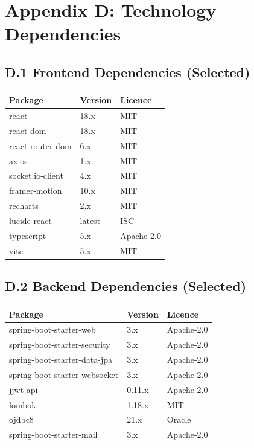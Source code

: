 \documentclass[
  12pt,
  a4paperpaper,
]{report}
\begin{document}
\clearpage
\section*{Appendix D: Technology
Dependencies}\label{appendix-d-technology-dependencies}

\subsection{D.1 Frontend Dependencies
(Selected)}\label{d.1-frontend-dependencies-selected}

\noindent\begin{tabularx}{\textwidth}{|p{4.5cm}|p{2.0cm}|X|}
\hline
\textbf{Package} & \textbf{Version} & \textbf{Licence} \\
\hline

react              & 18.x   & MIT \\[3pt]
\hline
react-dom          & 18.x   & MIT \\[3pt]
\hline
react-router-dom   & 6.x    & MIT \\[3pt]
\hline
axios              & 1.x    & MIT \\[3pt]
\hline
socket.io-client   & 4.x    & MIT \\[3pt]
\hline
framer-motion      & 10.x   & MIT \\[3pt]
\hline
recharts           & 2.x    & MIT \\[3pt]
\hline
lucide-react       & latest & ISC \\[3pt]
\hline
typescript         & 5.x    & Apache-2.0 \\[3pt]
\hline
vite               & 5.x    & MIT \\
\hline
\end{tabularx}

\subsection{D.2 Backend Dependencies
(Selected)}\label{d.2-backend-dependencies-selected}

\noindent\begin{tabularx}{\textwidth}{|p{6.5cm}|p{2.0cm}|X|}
\hline
\textbf{Package} & \textbf{Version} & \textbf{Licence} \\
\hline

spring-boot-starter-web       & 3.x    & Apache-2.0 \\[3pt]
\hline
spring-boot-starter-security  & 3.x    & Apache-2.0 \\[3pt]
\hline
spring-boot-starter-data-jpa  & 3.x    & Apache-2.0 \\[3pt]
\hline
spring-boot-starter-websocket & 3.x    & Apache-2.0 \\[3pt]
\hline
jjwt-api                      & 0.11.x & Apache-2.0 \\[3pt]
\hline
lombok                        & 1.18.x & MIT \\[3pt]
\hline
ojdbc8                        & 21.x   & Oracle \\[3pt]
\hline
spring-boot-starter-mail      & 3.x    & Apache-2.0 \\
\hline
\end{tabularx}
\end{document}
